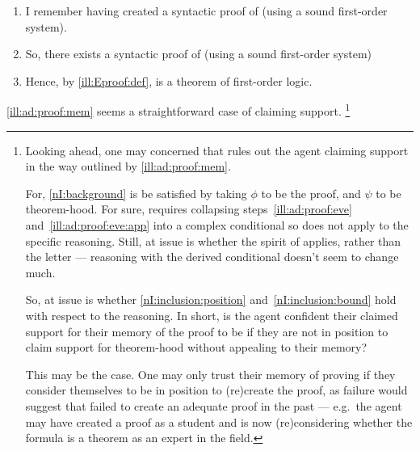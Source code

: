 \begin{note}[Memory]
  \begin{illustration}\label{ill:ad:proof:mem}
    \mbox{}
    \vspace{-\baselineskip}
    \begin{enumerate}
    \item\label{ill:Eproof:mem} I remember having created a syntactic proof of  (using a sound first-order system).
    \item\label{ill:Eproof:exP} So, there exists a syntactic proof of  (using a sound first-order system)
    \item\label{ill:Eproof:thm} Hence, by \ref{ill:Eproof:def},  is a theorem of first-order logic.
    \end{enumerate}
    \vspace{-\baselineskip}
  \end{illustration}

  \autoref{ill:ad:proof:mem} seems a straightforward case of claiming support.\nolinebreak
    \footnote{
      Looking ahead, one may concerned that \nI{} rules out the agent claiming support in the way outlined by \ref{ill:ad:proof:mem}.

      For, \ref{nI:background} is be satisfied by taking \(\phi\) to be the proof, and \(\psi\) to be theorem-hood.
      For sure, requires collapsing steps~\ref{ill:ad:proof:eve} and~\ref{ill:ad:proof:eve:app} into a complex conditional so \nI{} does not apply to the specific reasoning.
      Still, at issue is whether the spirit of \nI{} applies, rather than the letter --- reasoning with the derived conditional doesn't seem to change much.

      So, at issue is whether \ref{nI:inclusion:position} and~\ref{nI:inclusion:bound} hold with respect to the reasoning.
      In short, is the agent confident their claimed support for their memory of the proof to be \mom{} if they are not in position to claim support for theorem-hood without appealing to their memory?

      This may be the case.
      One may only trust their memory of proving if they consider themselves to be in position to (re)create the proof, as failure would suggest that failed to create an adequate proof in the past --- e.g.\ the agent may have created a proof as a student and is now (re)considering whether the formula is a theorem as an expert in the field.

}
\end{note}

